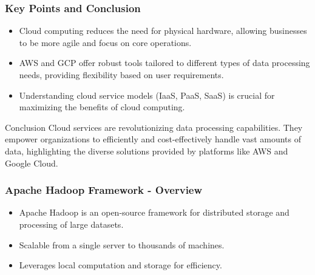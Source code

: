 \documentclass[aspectratio=169]{beamer}
\begin{document}
\begin{frame}[fragile]
  \frametitle{Key Points and Conclusion}
  \begin{itemize}
    \item Cloud computing reduces the need for physical hardware, allowing businesses to be more agile and focus on core operations.
    \item AWS and GCP offer robust tools tailored to different types of data processing needs, providing flexibility based on user requirements.
    \item Understanding cloud service models (IaaS, PaaS, SaaS) is crucial for maximizing the benefits of cloud computing.
  \end{itemize}
  
  \begin{block}{Conclusion}
    Cloud services are revolutionizing data processing capabilities. They empower organizations to efficiently and cost-effectively handle vast amounts of data, highlighting the diverse solutions provided by platforms like AWS and Google Cloud.
  \end{block}
\end{frame}

\begin{frame}[fragile]
    \frametitle{Apache Hadoop Framework - Overview}
    \begin{itemize}
        \item Apache Hadoop is an open-source framework for distributed storage and processing of large datasets.
        \item Scalable from a single server to thousands of machines.
        \item Leverages local computation and storage for efficiency.
    \end{itemize}
\end{frame}
\end{document}
